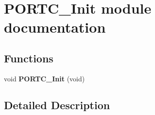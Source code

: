 \hypertarget{group___p_o_r_t_c___init__module}{}\section{P\+O\+R\+T\+C\+\_\+\+Init module documentation}
\label{group___p_o_r_t_c___init__module}
\subsection*{Functions}
\begin{DoxyCompactItemize}
\item 
void {\bfseries P\+O\+R\+T\+C\+\_\+\+Init} (void)\hypertarget{group___p_o_r_t_c___init__module_ga8bbe0457e76cd1c275a59e1d75665c09}{}\label{group___p_o_r_t_c___init__module_ga8bbe0457e76cd1c275a59e1d75665c09}

\end{DoxyCompactItemize}


\subsection{Detailed Description}
